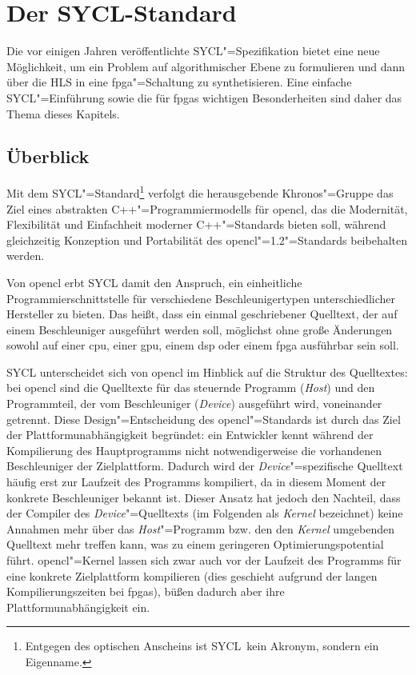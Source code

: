 \chapter{Der SYCL-Standard}\label{sycl}

Die vor einigen Jahren veröffentlichte SYCL"=Spezifikation bietet eine neue
Möglichkeit, um ein Problem auf algorithmischer Ebene zu formulieren und dann
über die HLS in eine \gls{fpga}"=Schaltung zu synthetisieren. Eine einfache
SYCL"=Einführung sowie die für \gls{fpga}s wichtigen Besonderheiten sind daher
das Thema dieses Kapitels.

\section{Überblick}\label{sycl:ueberblick}

Mit dem SYCL"=Standard\footnote{Entgegen des optischen Anscheins ist
\glqq SYCL\grqq\ kein Akronym, sondern ein Eigenname.}\cite[vgl.][]{sycl2019}
verfolgt die herausgebende Khronos"=Gruppe das Ziel eines abstrakten
C++"=Programmiermodells für \gls{opencl}, das die Modernität, Flexibilität und
Einfachheit moderner C++"=Standards bieten soll, während gleichzeitig
Konzeption und Portabilität des \gls{opencl}"=1.2"=Standards
\cite[vgl.][]{opencl2012} beibehalten werden.

Von \gls{opencl} erbt SYCL damit den Anspruch, ein einheitliche
Programmierschnittstelle für verschiedene Beschleunigertypen unterschiedlicher
Hersteller zu bieten. Das heißt, dass ein einmal geschriebener Quelltext, der
auf einem Beschleuniger ausgeführt werden soll, möglichst ohne große Änderungen
sowohl auf einer \gls{cpu}, einer \gls{gpu}, einem \gls{dsp} oder einem
\gls{fpga} ausführbar sein soll.

SYCL unterscheidet sich von \gls{opencl} im Hinblick auf die Struktur des
Quelltextes: bei \gls{opencl} sind die Quelltexte für das steuernde Programm
(\textit{Host}) und den Programmteil, der vom Beschleuniger (\textit{Device})
ausgeführt wird, voneinander getrennt. Diese Design"=Entscheidung des
\gls{opencl}"=Standards ist durch das Ziel der Plattformunabhängigkeit
begründet: ein Entwickler kennt während der Kompilierung des Hauptprogramms
nicht notwendigerweise die vorhandenen Beschleuniger der Zielplattform. Dadurch
wird der \textit{Device}"=spezifische Quelltext häufig erst zur Laufzeit des
Programms kompiliert, da in diesem Moment der konkrete Beschleuniger bekannt
ist. Dieser Ansatz hat jedoch den Nachteil, dass der Compiler des
\textit{Device}"=Quelltexts (im Folgenden als \textit{Kernel} bezeichnet) keine
Annahmen mehr über das \textit{Host}"=Programm bzw. den den \textit{Kernel}
umgebenden Quelltext mehr treffen kann, was zu einem geringeren
Optimierungspotential führt. \gls{opencl}"=Kernel lassen sich zwar auch vor
der Laufzeit des Programms für eine konkrete Zielplattform kompilieren (dies
geschieht aufgrund der langen Kompilierungszeiten bei \gls{fpga}s), büßen
dadurch aber ihre Plattformunabhängigkeit ein.

